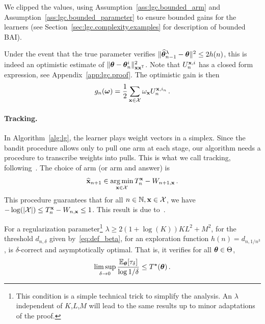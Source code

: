 We clipped the values, using Assumption~\ref{ass:lgc.bounded_arm} and Assumption~\ref{ass:lgc.bounded_parameter} to ensure bounded gains for the learners (see Section~\ref{sec:lgc.complexity.examples} for description of bounded BAI). 

Under the event that the true parameter verifies $\Vert \widehat{{\boldsymbol \theta}}_{n-1}^\lambda - {\boldsymbol \theta} \Vert^2 \le 2 h(n)$, this is indeed an optimistic estimate of $\Vert {\boldsymbol \theta} - {\boldsymbol \theta}_n^i \Vert^2_{{\bf x}{\bf x}^\mathsf{\scriptscriptstyle T}}$. Note that $U_n^{{\bf x},i}$ has a closed form expression, see Appendix~\ref{app:lgc.proof}. The optimistic gain is then
\[
    g_{n}({\boldsymbol \omega}) = \frac{1}{2}\sum_{{\bf x}\in\mathcal{X}}\omega_{\bf x} U_n^{{\bf x},i_n}\,.
\]


\paragraph{Tracking.} In Algorithm~\ref{alg:lg}, the learner plays weight vectors in a simplex. Since the bandit procedure allows only to pull one arm at each stage, our algorithm needs a procedure to transcribe weights into pulls. This is what we call tracking, following~\citet{garivier2016tracknstop}. The choice of arm (or arm and answer) is
\begin{align*}
    \widehat{{\bf x}}_{n+1} \in \operatorname*{arg\,min}_{{\bf x}\in \mathcal{X} } T_n^{{\bf x}} - W_{n+1,{\bf x}}\,.
\end{align*}
This procedure guarantees that for all $n\in{\mathbb N}, {\bf x}\in\mathcal{X}$, we have $- \log (|\mathcal{X}|) \le T_n^{{\bf x}} - W_{n,{\bf x}} \le 1$. This result is due to~\citet{degenne2020structure}.

\begin{theorem}\label{thm:lgc.sample_complexity}
\begin{leftbar}[theorembar]
For a regularization parameter\footnote{This condition is a simple technical trick to simplify the analysis. An $\lambda$ independent of $K$,$L$,$M$ will lead to the same results up to minor adaptations of the proof.} $\lambda \geq 2(1+\log(K))KL^2+M^2$, for the threshold $d_{n,\delta}$ given by~\eqref{eq:def_beta}, for an exploration function $h(n)=d_{n,1/n^3}$, \LG{} is $\delta$-correct and asymptotically optimal. That is, it verifies for all ${\boldsymbol \theta}\in \Theta$,
\begin{align*}
    \limsup_{\delta\to 0}\frac{\mathbb{E}_{\boldsymbol \theta}[\tau_\delta]}{ \log 1/\delta} \le T^{\star}({\boldsymbol \theta}) \,.
\end{align*}
\end{leftbar}
\end{theorem}


